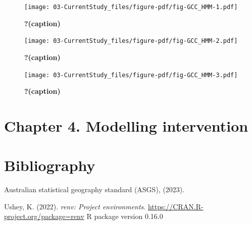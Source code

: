 \documentclass[
  letterpaper,
  DIV=11,
  numbers=noendperiod]{scrreprt}
\newlength{\cslhangindent}
\newlength{\cslentryspacingunit} %
\newenvironment{CSLReferences}[2] %
 {%
  \setlength{\parindent}{0pt}
  \ifodd #1
  \let\oldpar\par
  \def\par{\hangindent=\cslhangindent\oldpar}
  \fi
  \setlength{\parskip}{#2\cslentryspacingunit}
 }%
 {}
\begin{document}
\begin{figure}

{\centering \texttt{[image: 03-CurrentStudy\_files/figure-pdf/fig-GCC\_HMM-1.pdf]}

}

\caption{\label{fig-GCC_HMM-1}\textbf{?(caption)}}

\end{figure}

\begin{figure}

{\centering \texttt{[image: 03-CurrentStudy\_files/figure-pdf/fig-GCC\_HMM-2.pdf]}

}

\caption{\label{fig-GCC_HMM-2}\textbf{?(caption)}}

\end{figure}

\begin{figure}

{\centering \texttt{[image: 03-CurrentStudy\_files/figure-pdf/fig-GCC\_HMM-3.pdf]}

}

\caption{\label{fig-GCC_HMM-3}\textbf{?(caption)}}

\end{figure}


\hypertarget{chapter-4.-modelling-intervention}{%
\chapter{Chapter 4. Modelling
intervention}\label{chapter-4.-modelling-intervention}}


\hypertarget{bibliography}{%
\chapter*{Bibliography}\label{bibliography}}


\hypertarget{refs}{}
\begin{CSLReferences}{1}{0}
\leavevmode{}%
Australian statistical geography standard (ASGS), (2023).

\leavevmode{}%
Ushey, K. (2022). \emph{{renv}: Project environments}.
\url{https://CRAN.R-project.org/package=renv} R package version 0.16.0

\end{CSLReferences}
\end{document}
